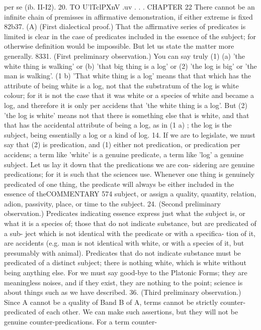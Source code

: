 {{{{{{{{{{{{{{{{{per se (ib. II-I2).
20. TO U'lTclPXnV
.uv . . .
CHAPTER 22
There cannot be an infinite chain of premisses in affirmative
demonstration, if either extreme is fixed
82b37. (A) (First dialectical proof.) That the affirmative series
of predicates is limited is clear in the case of predicates included
in the essence of the subject; for otherwise definition would be
impossible. But let us state the matter more generally.
8331. (First preliminary observation.) You can say truly (1)
(a) 'the white thing is walking' or (b) 'that big thing is a log' or
(2) 'the log is big' or 'the man is walking'. (1 b) 'That white thing
is a log' means that that which has the attribute of being white
is a log, not that the substratum of the log is white colour; for
it is not the case that it was white or a species of white and
became a log, and therefore it is only per accidens that 'the white
thing is a log'. But (2) 'the log is white' means not that there is
something else that is white, and that that has the accidental
attribute of being a log, as in (1 a) ; the log is the subject, being
essentially a log or a kind of log.
14. If we are to legislate, we must say that (2) is predication,
and (1) either not predication, or predication per accidens; a term
like 'white' is a genuine predicate, a term like 'log' a genuine
subject. Let us lay it down that the predications we are con-
sidering are genuine predications; for it is such that the sciences
use. Whenever one thing is genuinely predicated of one thing, the
predicate will always be either included in the essence of theCOMMENTARY
574
subject, or assign a quality, quantity, relation, adion, passivity,
place, or time to the subject.
24. (Second preliminary observation.) Predicates indicating
essence express just what the subject is, or what it is a species of;
those that do not indicate substance, but are predicated of a sub-
ject which is not identical with the predicate or with a specifica-
tion of it, are accidents (e.g. man is not identical with white,
or with a species of it, but presumably with animal). Predicates
that do not indicate substance must be predicated of a distinct
subject; there is nothing white, which is white without being
anything else. For we must say good-bye to the Platonic Forms;
they are meaningless noises, and if they exist, they are nothing
to the point; science is about things such as we have described.
36. (Third preliminary observation.) Since A cannot be a
quality of Band B of A, terms cannot be strictly counter-
predicated of each other. We can make such assertions, but they
will not be genuine counter-predications. For a term counter-
}}}}}}}}}}}}}}}}}
